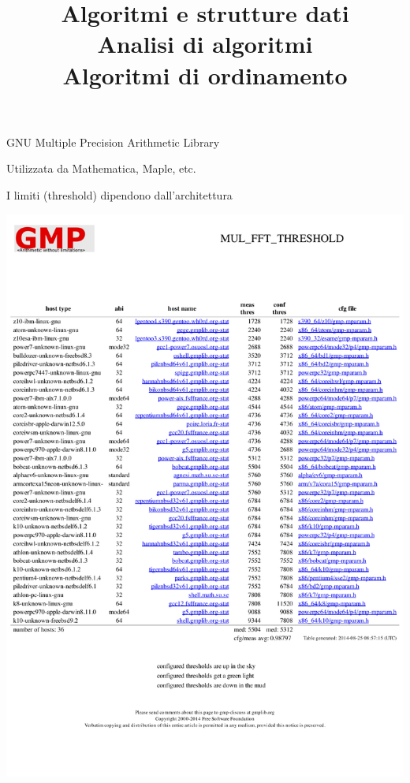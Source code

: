 \begin{frame}{GNU Multiple Precision Arithmetic Library}

\BI
\item Utilizzata da Mathematica, Maple, etc.
\item I limiti (threshold) dipendono dall'architettura
\EI

\includegraphics[width=\textwidth]{threshold.pdf}

\end{frame}


\title[ASD - Analisi di algoritmi]{\textbf{Algoritmi e strutture dati}\\[24pt]Analisi di algoritmi\\Algoritmi di ordinamento}

\FrameTitle

